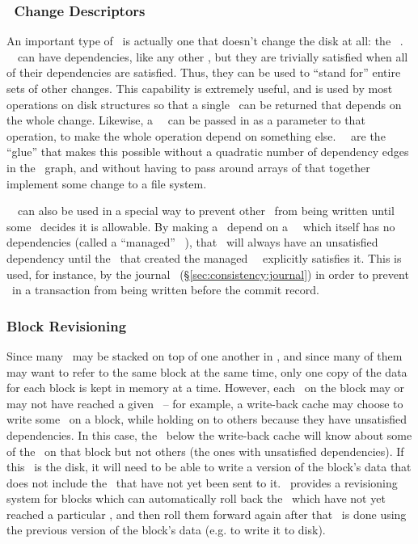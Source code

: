 \subsubsection{\Noop\ Change Descriptors}
\label{sec:design:chdescs:noop}
An important type of \chdesc\ is actually one that doesn't change the disk at
all: the \noop\ \chdesc. \Noop\ \chdescs\ can have dependencies, like any other
\chdesc, but they are trivially satisfied when all of their dependencies are
satisfied. Thus, they can be used to ``stand for'' entire sets of other changes.
This capability is extremely useful, and is used by most operations on disk
structures so that a single \chdesc\ can be returned that depends on the whole
change. Likewise, a \noop\ \chdesc\ can be passed in as a parameter to that
operation, to make the whole operation depend on something else. \Noop\
\chdescs\ are the ``glue'' that makes this possible without a quadratic number
of dependency edges in the \chdesc\ graph, and without having to pass around
arrays of \chdescs that together implement some change to a file system.

\Noop\ \chdescs\ can also be used in a special way to prevent other \chdescs\
from being written until some \module\ decides it is allowable. By making a
\chdesc\ depend on a \noop\ \chdesc\ which itself has no dependencies (called a
``managed'' \noop\ \chdesc), that \chdesc\ will always have an unsatisfied
dependency until the \module\ that created the managed \noop\ \chdesc\
explicitly satisfies it. This is used, for instance, by the journal \module\
(\S\ref{sec:consistency:journal}) in order to prevent \chdescs\ in a transaction
from being written before the commit record.

\subsubsection{Block Revisioning}
Since many \modules\ may be stacked on top of one another in \Kudos, and since
many of them may want to refer to the same block at the same time, only one copy
of the data for each block is kept in memory at a time. However, each \chdesc\
on the block may or may not have reached a given \module\ -- for example, a
write-back cache may choose to write some \chdescs\ on a block, while holding on
to others because they have unsatisfied dependencies. In this case, the \module\
below the write-back cache will know about some of the \chdescs\ on that block
but not others (the ones with unsatisfied dependencies). If this \module\ is the
disk, it will need to be able to write a version of the block's data that does
not include the \chdescs\ that have not yet been sent to it. \Kudos\ provides a
revisioning system for blocks which can automatically roll back the \chdescs\
which have not yet reached a particular \module, and then roll them forward
again after that \module\ is done using the previous version of the block's data
(e.g. to write it to disk).

